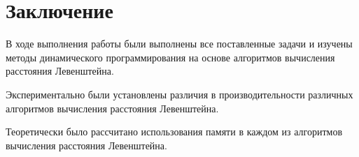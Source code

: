 \chapter*{Заключение}

В ходе выполнения работы были выполнены все поставленные задачи и изучены методы динамического программирования на основе алгоритмов вычисления расстояния Левенштейна.

Экспериментально были установлены различия в производительности различных алгоритмов вычисления расстояния Левенштейна.

Теоретически было рассчитано использования памяти в каждом из алгоритмов вычисления расстояния Левенштейна.
